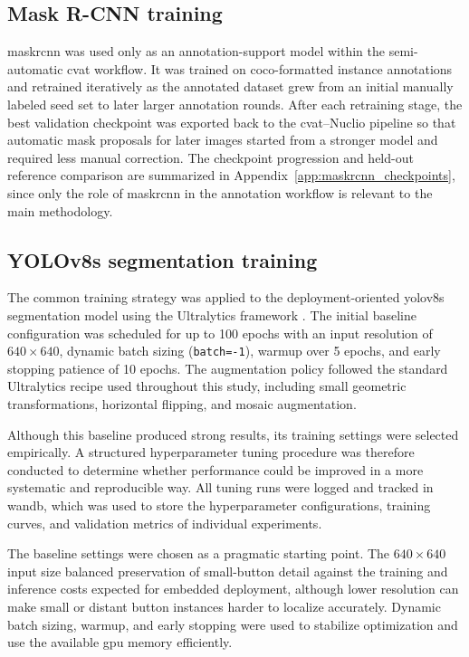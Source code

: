 \subsection{Mask R-CNN training}

\gls{maskrcnn} was used only as an annotation-support model within the
semi-automatic \gls{cvat} workflow. It was trained on \gls{coco}-formatted
instance annotations and retrained iteratively as the annotated dataset grew
from an initial manually labeled seed set to later larger annotation rounds.
After each retraining stage, the best validation checkpoint was exported back to
the \gls{cvat}--Nuclio pipeline so that automatic mask proposals for later
images started from a stronger model and required less manual correction. The
checkpoint progression and held-out reference comparison are summarized in
Appendix~\ref{app:maskrcnn_checkpoints}, since only the role of
\gls{maskrcnn} in the annotation workflow is relevant to the main methodology.

\subsection{YOLOv8s segmentation training}

The common training strategy was applied to the deployment-oriented \gls{yolo}v8s segmentation model using the Ultralytics framework \citep{ultralyticsdocs2026}. The initial baseline configuration was
scheduled for up to 100 epochs with an input resolution of $640 \times 640$, dynamic batch sizing
(\texttt{batch=-1}), warmup over 5 epochs, and early stopping patience
of 10 epochs. The augmentation policy followed the standard Ultralytics recipe used
throughout this study, including small geometric transformations,
horizontal flipping, and mosaic augmentation.

Although this baseline produced strong results, its training settings were selected
empirically. A structured hyperparameter tuning procedure was therefore conducted
to determine whether performance could be improved in a more systematic and
reproducible way. All tuning runs were logged and tracked in \gls{wandb}, which was
used to store the hyperparameter configurations, training curves, and validation
metrics of individual experiments.

The baseline settings were chosen as a pragmatic starting point. The
$640 \times 640$ input size balanced preservation of small-button detail against
the training and inference costs expected for embedded deployment, although
lower resolution can make small or distant button instances harder to localize
accurately. Dynamic batch sizing, warmup, and early stopping were used to
stabilize optimization and use the available \gls{gpu} memory efficiently.

